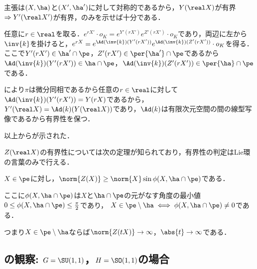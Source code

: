 \begin{pfwn}{}

  主張は$(X,\ha) $と$(X',\ha')$に対して対称的であるから，$Y(\real X) $が有界$\Rightarrow Y'(\real X') $が有界，のみを示せば十分である．

  任意に$r\in \real$を取る．$e^{rX'}\cdot o_K = e^{Y'(r X')}e^{Z'(r X')}\cdot o_K  $であり，両辺に左から$\inv{k} $を掛けると，$e^{r X} = e^{\Ad(\inv{k})( Y'(r X'))}e^{\Ad(\inv{k})( Z'(r X'))}\cdot o_K  $を得る．ここで$Y'(rX')\in \ha'\cap \pe $，$Z'(r X')\in \per{\ha'}\cap \pe $であるから$\Ad(\inv{k})(Y'(r X'))\in \ha\cap \pe $，$\Ad(\inv{k})(Z'(r X')) \in \per{\ha}\cap \pe $である．

  により$\pi$は微分同相であるから任意の$r\in \real$に対して$\Ad(\inv{k})(Y'(r X')) = Y(rX)  $であるから，$Y'(\real X) = \Ad(k)(Y(\real X))  $であり，$\Ad(k) $は有限次元空間の間の線型写像であるから有界性を保つ．

  以上からが示された．
  
\end{pfwn}


$Z(\real X) $の有界性については次の定理が知られており，有界性の判定はLie環の言葉のみで行える．

\begin{thm}\cite[Lemmma~5.4]{kob97}\label{thm:kob97}
  
  $X\in \pe$に対し，$\norm{Z(X)}\geq \norm{X} \sin\phi(X, \ha\cap\pe)$である．

  ここに$\phi(X,\ha\cap \pe) $は$X$と$\ha\cap \pe$の元がなす角度の最小値$0\leq \phi(X,\ha\cap \pe) \leq \frac{\pi}{2} $であり，
  $X\in \pe\setminus \ha \iff \phi(X,\ha\cap \pe)\neq 0 $である．
\end{thm}

つまり$ X\in \pe\setminus \ha$ならば$\norm{Z(t X)}\to \infty $，$\abs{t}\to \infty $である．


\subsection{の観察: $G = \SU(1,1) $，$H = \SO(1,1) $の場合}

